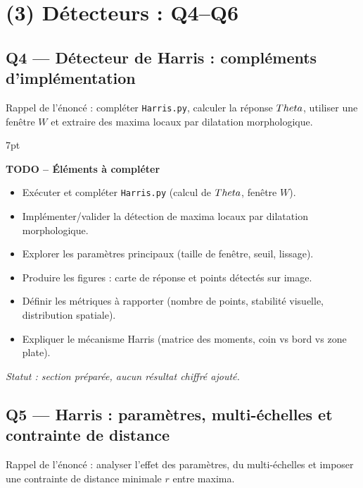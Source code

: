 \documentclass[11pt,a4paper]{article}
\newenvironment{formal}{%
\def\FrameCommand{%
  \hspace{1pt}%
  {\color{enstaBleuFonce}\vrule width 2pt}%
  {\color{formalshade}\vrule width 4pt}%
  \colorbox{formalshade}%
}%
\MakeFramed{\advance\hsize-\width\FrameRestore}%
\noindent\hspace{-4.55pt}%
\begin{adjustwidth}{}{7pt}%
\vspace{4pt}%
}{%
\vspace{4pt}\end{adjustwidth}\endMakeFramed%
}
\begin{document}
\section{(3) Détecteurs : Q4--Q6}

\subsection{Q4 --- Détecteur de Harris : compléments d'implémentation}
Rappel de l'énoncé : compléter \texttt{Harris.py}, calculer la réponse \(\\Theta\), utiliser une fenêtre \(W\) et extraire des maxima locaux par dilatation morphologique.

\begin{formal}
\textbf{TODO -- Éléments à compléter}
\begin{itemize}[leftmargin=1.5em]
  \item Exécuter et compléter \texttt{Harris.py} (calcul de \(\\Theta\), fenêtre \(W\)).
  \item Implémenter/valider la détection de maxima locaux par dilatation morphologique.
  \item Explorer les paramètres principaux (taille de fenêtre, seuil, lissage).
  \item Produire les figures : carte de réponse et points détectés sur image.
  \item Définir les métriques à rapporter (nombre de points, stabilité visuelle, distribution spatiale).
  \item Expliquer le mécanisme Harris (matrice des moments, coin vs bord vs zone plate).
\end{itemize}
\end{formal}
\textit{Statut : section préparée, aucun résultat chiffré ajouté.}

\subsection{Q5 --- Harris : paramètres, multi-échelles et contrainte de distance}
Rappel de l'énoncé : analyser l'effet des paramètres, du multi-échelles et imposer une contrainte de distance minimale \(r\) entre maxima.
\end{document}
